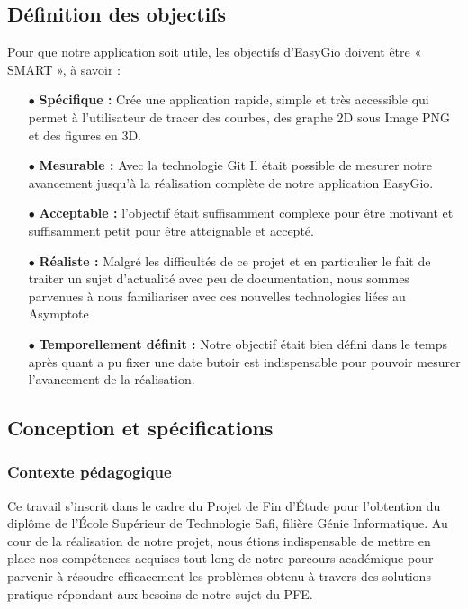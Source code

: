 \documentclass[a4paper]{report}
\begin{document}
\subsection{Définition des objectifs}
Pour que notre application soit utile, les objectifs d'EasyGio doivent être « SMART », à savoir :
\begin{itemize}
    \item[$\bullet$] \textbf{Spécifique : }Crée une application rapide, simple et très accessible qui permet à l'utilisateur de tracer des courbes, des graphe 2D sous Image PNG et des figures en 3D.
    \item[$\bullet$] \textbf{Mesurable : }Avec la technologie Git Il était possible de mesurer notre avancement jusqu'à la réalisation complète de notre application EasyGio.
    \item[$\bullet$] \textbf{Acceptable : }l’objectif était suffisamment complexe pour être motivant et suffisamment petit pour être atteignable et accepté.
    \item[$\bullet$] \textbf{Réaliste : }Malgré les difficultés de ce projet et en particulier le fait de traiter un sujet d’actualité avec peu de documentation, nous sommes parvenues à nous familiariser avec ces nouvelles technologies liées au Asymptote
    \item[$\bullet$] \textbf{Temporellement définit : }Notre objectif était bien défini dans le temps après quant a pu fixer une date butoir est indispensable pour pouvoir mesurer l’avancement de la réalisation.
\end{itemize}
\subsection{Conception et spécifications}
\subsubsection{Contexte pédagogique}
Ce travail s'inscrit dans le cadre du Projet de Fin d'Étude pour l'obtention du diplôme de l'École Supérieur de Technologie Safi, filière Génie Informatique. Au cour de la réalisation de notre projet, nous étions indispensable de mettre en place nos compétences acquises tout long de notre parcours académique pour parvenir à résoudre efficacement les problèmes obtenu à travers des solutions pratique répondant aux besoins de notre sujet du PFE.
\end{document}
